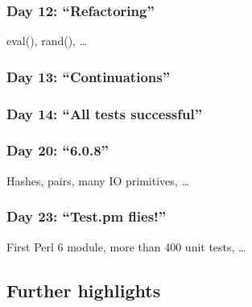 \documentclass[12pt,compress,english,utf8,t]{beamer}
\newcommand{\inputminted}[2]{}
\begin{document}
\begin{frame}[label=refactoring]\frametitle{Day 12: ``Refactoring''}
  eval(), rand(), \ldots\par
  \inputminted{haskell}{code-snippets/day012-prim.hs}
\end{frame}

\begin{frame}[label=continuations]\frametitle{Day 13: ``Continuations''}
  \inputminted{haskell}{code-snippets/day013-monads.hs}
  \bigskip
  \inputminted{haskell}{code-snippets/day013-ast.hs}
\end{frame}

\begin{frame}[label=all-tests-successful]\frametitle{Day 14: ``All tests successful''}
  \inputminted{perl}{code-snippets/day014-basic.pl}
\end{frame}

\begin{frame}[label=608]\frametitle{Day 20: ``6.0.8''}
  Hashes, pairs, many IO primitives, \ldots\par
  \inputminted{perl}{code-snippets/day020-ycombinator.pl}
\end{frame}

\begin{frame}[label=testpm]\frametitle{Day 23: ``Test.pm flies!''}
  First Perl 6 module, more than 400 unit tests, \ldots\par
  \inputminted{perl}{code-snippets/day023-test.pm}
\end{frame}


\subsection{Further highlights}
\end{document}
